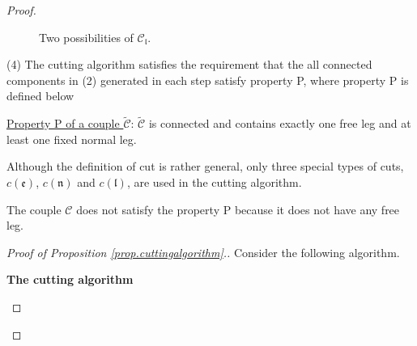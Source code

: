 \begin{proof}
\begin{prop}
\begin{figure}[H]
{
    }
        \caption{Two possibilities of $\mathcal{C}_\mathfrak{l}$.}
        \label{fig.2possibilities}
    \end{figure}
    
(4) The cutting algorithm satisfies the requirement that the all connected components in (2) generated in each step satisfy property P, where property P is defined below

\underline{Property P of a couple $\widetilde{\mathcal{C}}$}: $\widetilde{\mathcal{C}}$ is connected and contains exactly one free leg and at least one fixed normal leg.



\end{prop}

\begin{rem}
Although the definition of cut is rather general, only three special types of cuts, $c(\mathfrak{e})$, $c(\mathfrak{n})$ and $c(\mathfrak{l})$, are used in the cutting algorithm.
\end{rem}

\begin{rem}
The couple $\mathcal{C}$ does not satisfy the property P because it does not have any free leg.
\end{rem}

\begin{proof}[Proof of Proposition \ref{prop.cuttingalgorithm}.] Consider the following algorithm.

\medskip


\begin{mdframed}

\centerline{\textbf{The cutting algorithm}}

\medskip 


\end{mdframed}
\end{proof}
\end{proof}
